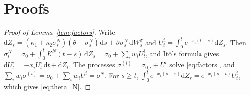 \documentclass{rQUF2e}
\theoremstyle{plain}
\theoremstyle{definition}
\theoremstyle{remark}
\newcommand{\D}{\mathrm{d}}
\begin{document}


\appendices

\section{Proofs}\label{app:proofs}

\begin{proof}[Proof of Lemma~\ref{lem:factors}] Write $\D Z_s=(\kappa_1+\kappa_2\sigma^N_s)(\theta-\sigma^N_s)\,\D s+\vartheta\sigma^N_s\,\D W^\sigma_s$ and $U^{i}_t=\int_0^te^{-x_i(t-s)}\D Z_s$. Then $\sigma^N_t=\sigma_0+\int_0^tK^N(t-s)\,\D Z_s=\sigma_0+\sum_iw_iU^i_t$, and It\^o's formula gives $\D U^i_t=-x_iU^i_t\,\D t+\D Z_t$. The processes $\sigma^{(i)}=\sigma_{0,i}+U^i$ solve \eqref{eq:factors}, and $\sum_iw_i\sigma^{(i)}=\sigma_0+\sum_iw_iU^i=\sigma^N$. For $s\ge t$, $\int_0^te^{-x_i(s-r)}\D Z_r=e^{-x_i(s-t)}U^i_t$, which gives \eqref{eq:theta_N}. \end{proof}
\end{document}
